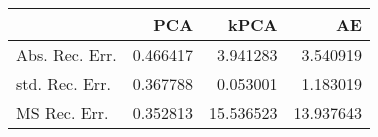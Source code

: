 \begin{tabular}{lrrr}
\toprule
{} &       PCA &       kPCA &         AE \\
\midrule
Abs. Rec. Err. &  0.466417 &   3.941283 &   3.540919 \\
std. Rec. Err. &  0.367788 &   0.053001 &   1.183019 \\
MS Rec. Err.   &  0.352813 &  15.536523 &  13.937643 \\
\bottomrule
\end{tabular}
